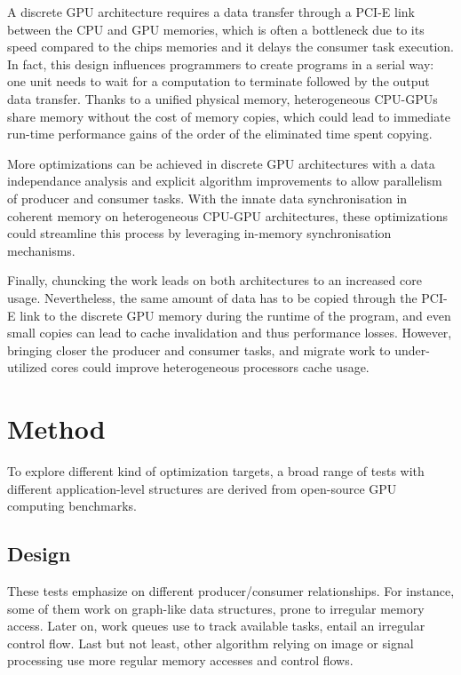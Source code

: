 \documentclass[11pt,twoside,a4paper]{article}
\begin{document}
\begin{multicols}{2}
A discrete GPU architecture requires a data transfer through a PCI-E link
between the CPU and GPU memories, which is often a bottleneck due to its speed
compared to the chips memories and it delays the consumer task execution. In
fact, this design influences programmers to create programs in a serial way:
one unit needs to wait for a computation to terminate followed by the output
data transfer. Thanks to a unified physical memory, heterogeneous CPU-GPUs
share memory without the cost of memory copies, which could lead to immediate
run-time performance gains of the order of the eliminated time spent copying.

More optimizations can be achieved in discrete GPU architectures with a data
independance analysis and explicit algorithm improvements to allow parallelism
of producer and consumer tasks. With the innate data synchronisation in
coherent memory on heterogeneous CPU-GPU architectures, these optimizations
could streamline this process by leveraging in-memory synchronisation
mechanisms.

Finally, chuncking the work leads on both architectures to an increased core
usage. Nevertheless, the same amount of data has to be copied through the PCI-E
link to the discrete GPU memory during the runtime of the program, and even
small copies can lead to cache invalidation and thus performance losses.
However, bringing closer the producer and consumer tasks, and migrate work to
under-utilized cores could improve heterogeneous processors cache usage.

\section{Method}

To explore different kind of optimization targets, a broad range of tests with
different application-level structures are derived from open-source GPU computing
benchmarks.

\subsection{Design}

These tests emphasize on different producer/consumer relationships. For
instance, some of them work on graph-like data structures, prone to irregular
memory access. Later on, work queues use to track available tasks, entail an
irregular control flow. Last but not least, other algorithm relying on image or
signal processing use more regular memory accesses and control flows.


\end{multicols}
\end{document}
